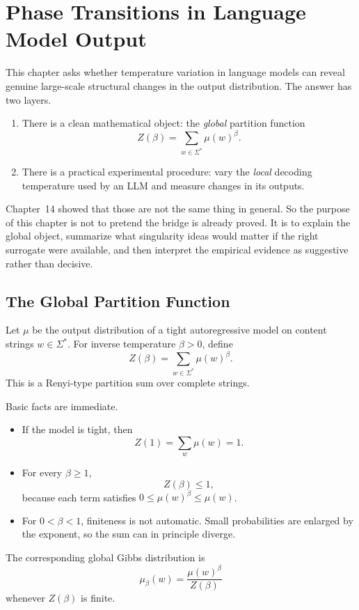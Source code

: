 \chapter{Phase Transitions in Language Model Output}
\label{ch15}

This chapter asks whether temperature variation in language models can reveal genuine large-scale structural changes in the output distribution. The answer has two layers.

\begin{enumerate}
  \item There is a clean mathematical object: the \emph{global} partition function
  \[
    Z(\beta) = \sum_{w \in \Sigma^*} \mu(w)^\beta.
  \]
  \item There is a practical experimental procedure: vary the \emph{local} decoding temperature used by an LLM and measure changes in its outputs.
\end{enumerate}

Chapter~14 showed that those are not the same thing in general. So the purpose of this chapter is not to pretend the bridge is already proved. It is to explain the global object, summarize what singularity ideas would matter if the right surrogate were available, and then interpret the empirical evidence as suggestive rather than decisive.

\section{The Global Partition Function}

Let $\mu$ be the output distribution of a tight autoregressive model on content strings $w \in \Sigma^*$. For inverse temperature $\beta>0$, define
\[
  Z(\beta) = \sum_{w \in \Sigma^*} \mu(w)^\beta.
\]
This is a Renyi-type partition sum over complete strings.

Basic facts are immediate.
\begin{itemize}
  \item If the model is tight, then
  \[
    Z(1) = \sum_w \mu(w) = 1.
  \]
  \item For every $\beta \ge 1$,
  \[
    Z(\beta) \le 1,
  \]
  because each term satisfies $0 \le \mu(w)^\beta \le \mu(w)$.
  \item For $0<\beta<1$, finiteness is not automatic. Small probabilities are enlarged by the exponent, so the sum can in principle diverge.
\end{itemize}

The corresponding global Gibbs distribution is
\[
  \mu_\beta(w) = \frac{\mu(w)^\beta}{Z(\beta)}
\]
whenever $Z(\beta)$ is finite.

